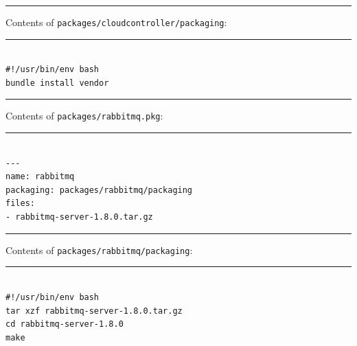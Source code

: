 \begin{center}\rule{3in}{0.4pt}\end{center}


Contents of \texttt{packages\slash cloudcontroller\slash packaging}:

\begin{center}\rule{3in}{0.4pt}\end{center}


\begin{adjustwidth}{2.5em}{2.5em}
\begin{verbatim}

#!/usr/bin/env bash
bundle install vendor

\end{verbatim}
\end{adjustwidth}

\begin{center}\rule{3in}{0.4pt}\end{center}


Contents of \texttt{packages\slash rabbitmq.pkg}:

\begin{center}\rule{3in}{0.4pt}\end{center}


\begin{adjustwidth}{2.5em}{2.5em}
\begin{verbatim}

---
name: rabbitmq
packaging: packages/rabbitmq/packaging
files:
- rabbitmq-server-1.8.0.tar.gz

\end{verbatim}
\end{adjustwidth}

\begin{center}\rule{3in}{0.4pt}\end{center}


Contents of \texttt{packages\slash rabbitmq\slash packaging}:

\begin{center}\rule{3in}{0.4pt}\end{center}


\begin{adjustwidth}{2.5em}{2.5em}
\begin{verbatim}

#!/usr/bin/env bash
tar xzf rabbitmq-server-1.8.0.tar.gz
cd rabbitmq-server-1.8.0
make

\end{verbatim}
\end{adjustwidth}

